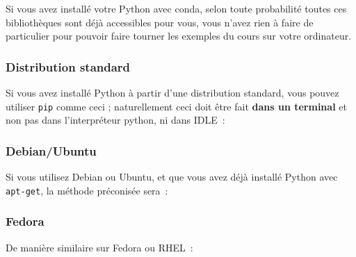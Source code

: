     Si vous avez installé votre Python avec conda, selon toute probabilité
toutes ces bibliothèques sont déjà accessibles pour vous, vous n'avez
rien à faire de particulier pour pouvoir faire tourner les exemples du
cours sur votre ordinateur.

    \hypertarget{distribution-standard}{%
\subsubsection{Distribution standard}\label{distribution-standard}}

    Si vous avez installé Python à partir d'une distribution standard, vous
pouvez utiliser \texttt{pip} comme ceci ; naturellement ceci doit être
fait \textbf{dans un terminal} et non pas dans l'interpréteur python, ni
dans IDLE~:

    \begin{Shaded}
\begin{Highlighting}[frame=lines,framerule=0.6mm,rulecolor=\color{asisframecolor}]
\end{Highlighting}
\end{Shaded}

    \hypertarget{debianubuntu}{%
\subsubsection{Debian/Ubuntu}\label{debianubuntu}}

    Si vous utilisez Debian ou Ubuntu, et que vous avez déjà installé Python
avec \texttt{apt-get}, la méthode préconisée sera~:

    \begin{Shaded}
\begin{Highlighting}[frame=lines,framerule=0.6mm,rulecolor=\color{asisframecolor}]
\OperatorTok{-}\OperatorTok{-}\OperatorTok{-}\OperatorTok{-}
\end{Highlighting}
\end{Shaded}

    \hypertarget{fedora}{%
\subsubsection{Fedora}\label{fedora}}

    De manière similaire sur Fedora ou RHEL~:

    \begin{Shaded}
\begin{Highlighting}[frame=lines,framerule=0.6mm,rulecolor=\color{asisframecolor}]
\OperatorTok{-}\OperatorTok{-}\OperatorTok{-}
\end{Highlighting}
\end{Shaded}


    
    
    
